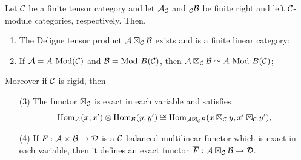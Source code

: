 \documentclass{amsart}
\begin{document}
\begin{theorem} \label{thm:DelignePrdtOverATCExists}
	Let $\mathcal C$ be a finite tensor category and let $\mathcal A_{\mathcal C}$ and ${}_{\mathcal C}\mathcal B$ be finite right and left $\mathcal C$-module categories, respectively. Then,
	\begin{enumerate}
		\item The Deligne tensor product $\mathcal A \boxtimes_{\mathcal C} \mathcal B$ exists and is a finite linear category;
		\item If $\cA = \Mod{A}{}(\cC)$ and $\cB = \Mod{}{B}(\cC)$, then $\cA \boxtimes_{\cC} \cB \simeq \Mod{A }{B}(\cC)$;
	\end{enumerate} 
Moreover if $\mathcal C$ is rigid, then 	
	\begin{enumerate}
		\item[(3)] The functor $\boxtimes_{\mathcal C}$ is exact in each variable and satisfies 
		\begin{equation*}
			\operatorname{Hom}_{\mathcal A}(x,x') \otimes \operatorname{Hom}_{\mathcal B}(y, y') \cong \operatorname{Hom}_{\mathcal A \boxtimes_{\mathcal C} \mathcal B} (x \boxtimes_{\mathcal C} y, x' \boxtimes_{\mathcal C} y'),
		\end{equation*}
		\item[(4)] If $F: \mathcal A \times \mathcal B \to \mathcal D$ is a $\mathcal C$-balanced multilinear functor which is exact in each variable, then it defines an exact functor $\overline{F}: \mathcal A \boxtimes_{\mathcal C} \mathcal B \to \mathcal D$. 
	\end{enumerate} 
\end{theorem}
\end{document}
